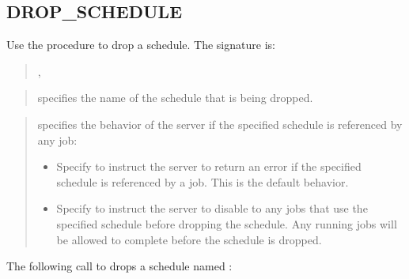 \documentclass[letterpaper,10pt,english,openany,oneside]{sphinxmanual}
\begin{document}
\newpage


\subsection{DROP\_SCHEDULE}
\label{\detokenize{drop_schedule::doc}}\label{\detokenize{drop_schedule:drop-schedule}}
Use the  procedure to drop a schedule. The signature is:
\begin{quote}

\begin{DUlineblock}{0em}
\item[] 
\item[] ,
\item[] 
\end{DUlineblock}
\end{quote}


\begin{quote}

 specifies the name of the schedule that is being
dropped.
\end{quote}

\begin{quote}

 specifies the behavior of the server if the specified
schedule is referenced by any job:
\begin{itemize}
\item {} 
Specify  to instruct the server to return an error if the
specified schedule is referenced by a job. This is the default
behavior.

\item {} 
Specify  to instruct the server to disable to any jobs that use
the specified schedule before dropping the schedule. Any running jobs
will be allowed to complete before the schedule is dropped.

\end{itemize}
\end{quote}


The following call to  drops a schedule named
:
\end{document}
